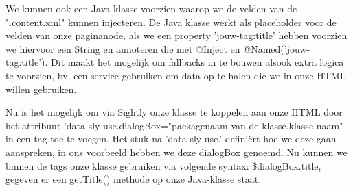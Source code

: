 \documentclass{article}
\begin{document}
	\par
	We kunnen ook een Java-klasse voorzien waarop we de velden van de ".content.xml" kunnen injecteren. De Java klasse werkt als placeholder voor de velden van onze paginanode, als we een property 'jouw-tag:title' hebben voorzien we hiervoor een String en annoteren die met @Inject en @Named('jouw-tag:title'). Dit maakt het mogelijk om fallbacks in te bouwen alsook extra logica te voorzien, bv. een service gebruiken om data op te halen die we in onze HTML willen gebruiken.  
	\par
	Nu is het mogelijk om via Sightly onze klasse te koppelen aan onze HTML door het attribuut 'data-sly-use.dialogBox="packagenaam-van-de-klasse.klasse-naam" in een tag toe te voegen. Het stuk na 'data-sly-use.' defini\"ert hoe we deze gaan aanspreken, in ons voorbeeld hebben we deze dialogBox genoemd. Nu kunnen we binnen de tags onze klasse gebruiken via volgende syntax: \${dialogBox.title}, gegeven er een getTitle() methode op onze Java-klasse staat.
	
\end{document}
